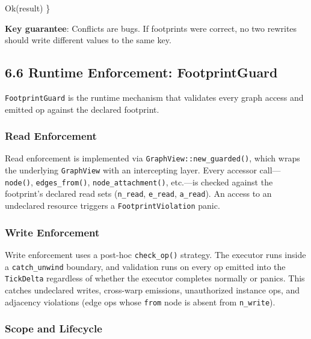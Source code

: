 \documentclass[
]{book}
\newenvironment{Shaded}{}{}
\newcommand{\ConstantTok}[1]{\textcolor[rgb]{0.53,0.00,0.00}{#1}}
\newcommand{\NormalTok}[1]{#1}
\newcommand{\OperatorTok}[1]{\textcolor[rgb]{0.40,0.40,0.40}{#1}}
\begin{document}
\begin{Shaded}
\begin{Highlighting}[]
    \ConstantTok{Ok}\NormalTok{(result)}
\OperatorTok{\}}
\end{Highlighting}
\end{Shaded}

\textbf{Key guarantee}: Conflicts are bugs. If footprints were correct,
no two rewrites should write different values to the same key.

\subsection{6.6 Runtime Enforcement:
FootprintGuard}\label{runtime-enforcement-footprintguard}

\texttt{FootprintGuard} is the runtime mechanism that validates every
graph access and emitted op against the declared footprint.

\subsubsection{Read Enforcement}\label{read-enforcement}

Read enforcement is implemented via \texttt{GraphView::new\_guarded()},
which wraps the underlying \texttt{GraphView} with an intercepting layer.
Every accessor call---\texttt{node()}, \texttt{edges\_from()},
\texttt{node\_attachment()}, etc.---is checked against the footprint's
declared read sets (\texttt{n\_read}, \texttt{e\_read}, \texttt{a\_read}).
An access to an undeclared resource triggers a \texttt{FootprintViolation}
panic.

\subsubsection{Write Enforcement}\label{write-enforcement}

Write enforcement uses a post-hoc \texttt{check\_op()} strategy. The
executor runs inside a \texttt{catch\_unwind} boundary, and validation
runs on every op emitted into the \texttt{TickDelta} regardless of
whether the executor completes normally or panics. This catches undeclared
writes, cross-warp emissions, unauthorized instance ops, and adjacency
violations (edge ops whose \texttt{from} node is absent from
\texttt{n\_write}).

\subsubsection{Scope and Lifecycle}\label{scope-and-lifecycle}
\end{document}
